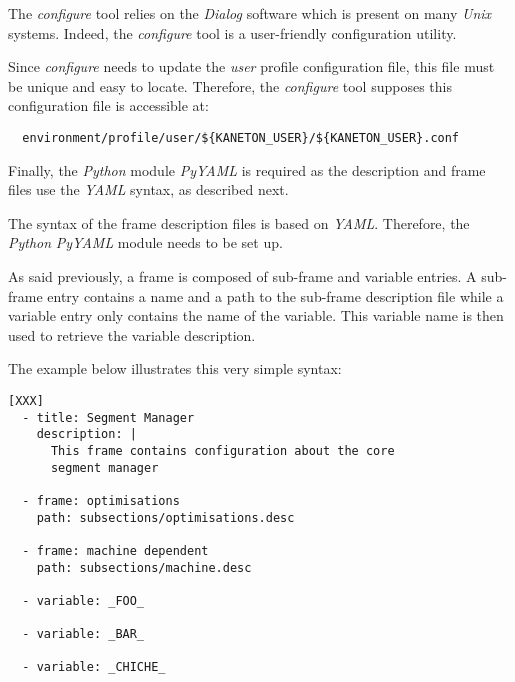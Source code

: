 

The \textit{configure} tool relies on the \textit{Dialog} software which
is present on many \textit{Unix} systems. Indeed, the \textit{configure}
tool is a user-friendly configuration utility.

Since \textit{configure} needs to update the \textit{user} profile
configuration file, this file must be unique and easy to locate. Therefore,
the \textit{configure} tool supposes this configuration file is accessible at:

\begin{verbatim}
  environment/profile/user/${KANETON_USER}/${KANETON_USER}.conf
\end{verbatim}

Finally, the \textit{Python} module \textit{PyYAML} is required as the
description and frame files use the \textit{YAML} syntax, as described next.



The syntax of the frame description files is based on \textit{YAML}. Therefore,
the \textit{Python} \textit{PyYAML} module needs to be set up.

As said previously, a frame is composed of sub-frame and variable entries. A
sub-frame entry contains a name and a path to the sub-frame description file
while a variable entry only contains the name of the variable. This variable
name is then used to retrieve the variable description.

The example below illustrates this very simple syntax:

\begin{verbatim}
[XXX]
  - title: Segment Manager
    description: |
      This frame contains configuration about the core
      segment manager

  - frame: optimisations
    path: subsections/optimisations.desc

  - frame: machine dependent
    path: subsections/machine.desc

  - variable: _FOO_

  - variable: _BAR_

  - variable: _CHICHE_
\end{verbatim}
